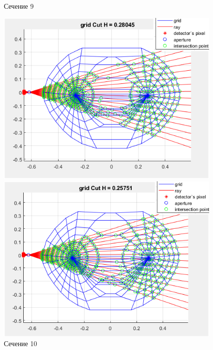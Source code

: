 \documentclass[a4]{article}
\begin{document}
\begin{figure}[H]
\begin{center}
\caption{Сечение 9}
\includegraphics{pic14.png} 

\caption{Сечение 10}
\includegraphics{pic15.png} 
\end{center}
\end{figure}
\end{document}
